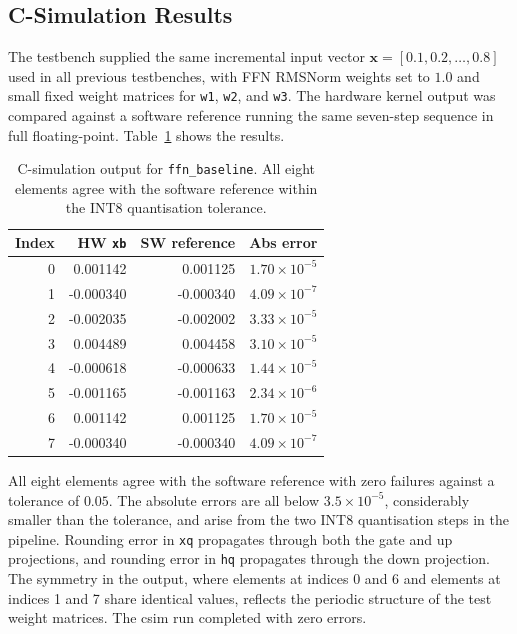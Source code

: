 \subsection{C-Simulation Results}
\label{subsec:ffn_csim}

The testbench supplied the same incremental input vector
$\mathbf{x} = [0.1, 0.2, \ldots, 0.8]$ used in all previous testbenches,
with FFN RMSNorm weights set to $1.0$ and small fixed weight matrices for
\texttt{w1}, \texttt{w2}, and \texttt{w3}. The hardware kernel output was
compared against a software reference running the same seven-step sequence
in full floating-point. Table~\ref{tab:ffn_csim} shows the results.

\begin{table}[H]
  \centering
  \begin{tabular}{rrrr}
    \toprule
    Index & HW \texttt{xb} & SW reference & Abs error \\
    \midrule
    0 &  0.001142 &  0.001125 & $1.70 \times 10^{-5}$ \\
    1 & -0.000340 & -0.000340 & $4.09 \times 10^{-7}$ \\
    2 & -0.002035 & -0.002002 & $3.33 \times 10^{-5}$ \\
    3 &  0.004489 &  0.004458 & $3.10 \times 10^{-5}$ \\
    4 & -0.000618 & -0.000633 & $1.44 \times 10^{-5}$ \\
    5 & -0.001165 & -0.001163 & $2.34 \times 10^{-6}$ \\
    6 &  0.001142 &  0.001125 & $1.70 \times 10^{-5}$ \\
    7 & -0.000340 & -0.000340 & $4.09 \times 10^{-7}$ \\
    \bottomrule
  \end{tabular}
  \caption{C-simulation output for \texttt{ffn\_baseline}.
           All eight elements agree with the software reference within
           the INT8 quantisation tolerance.}
  \label{tab:ffn_csim}
\end{table}

All eight elements agree with the software reference with zero failures
against a tolerance of $0.05$. The absolute errors are all below
$3.5 \times 10^{-5}$, considerably smaller than the tolerance, and
arise from the two INT8 quantisation steps in the pipeline. Rounding
error in \texttt{xq} propagates through both the gate and up projections,
and rounding error in \texttt{hq} propagates through the down projection.
The symmetry in the output, where elements at indices 0 and 6 and elements
at indices 1 and 7 share identical values, reflects the periodic structure
of the test weight matrices. The csim run completed with zero errors.

